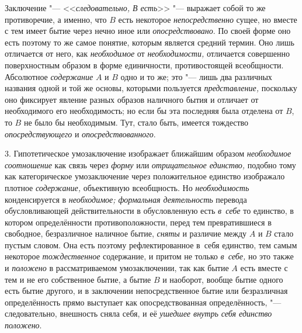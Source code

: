 Заключение "--- <<{\em следовательно, В есть}>>
"--- выражает собой то же противоречие, а именно, что
$B$ есть некоторое {\em непосредственно}
сущее, но вместе с тем имеет бытие через нечно иное или
{\em опосредствовано}.
По своей форме оно есть поэтому то же самое понятие, которым
является средний термин. Оно лишь отличается от него, как
{\em необходимое} от {\em необходимости,}
отличается совершенно поверхностным образом в форме
единичности, противостоящей всеобщности. Абсолютное
{\em содержание} $A$ и $B$ одно и то же;
это "--- лишь два различных названия одной и той же основы,
которыми пользуется {\em представление,}
поскольку оно фиксирует явление разных образов наличного
бытия и отличает от необходимого его необходимость; но если бы эта
последняя была отделена от $B$, то $B$ не было бы необходимым.
Тут, стало быть, имеется тождество {\em опосредствующего} и
{\em опосредствованного}.

3. Гипотетическое умозаключение изображает ближайшим образом
{\em необходимое соотношение}
как связь через {\em форму} или {\em отрицательное единство,}
подобно тому как категорическое умозаключение через
положительное единство изображало плотное
{\em содержание,} объективную всеобщность. Но {\em необходимость}
конденсируется в {\em необходимое; формальная деятельность}
перевода обусловливающей действительности в обусловленную есть {\em в~себе} то
единство, в котором определённости противоположности, перед тем
превратившиеся в свободное, безразличное наличное бытие,
{\em сняты} и различие между $A$ и $B$ стало пустым
словом. Она есть поэтому рефлектированное в~себя единство,
тем самым некоторое {\em тождественное}
содержание, и притом не только {\em в~себе,} но это также и {\em положено} в
рассматриваемом умозаключении, так как бытие $A$ есть вместе с тем
и не его собственное бытие, а бытие $B$ и наоборот,
вообще бытие одного есть бытие другого, и в заключении непосредственное
бытие или безразличная определённость прямо выступает как опосредствованная
определённость, "--- следовательно, внешность сняла себя, и её
{\em ушедшее внутрь себя единство положено}.

